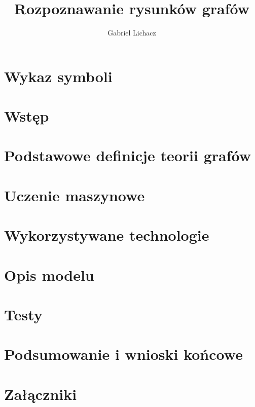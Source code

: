 \documentclass[12pt,twoside]{article}
\author{Gabriel Lichacz}
\title{Rozpoznawanie rysunków grafów}
\begin{document}
\maketitle

\blankpage

\tableofcontents

\clearpage
\blankpage

\section*{Wykaz symboli}

\clearpage

\section{Wstęp}


\section{Podstawowe definicje teorii grafów}


\section{Uczenie maszynowe}


\section{Wykorzystywane technologie}


\section{Opis modelu}


\section{Testy}


\section{Podsumowanie i wnioski końcowe}


\clearpage

\section*{Załączniki}


\clearpage



\clearpage

\makesummary
\end{document}
